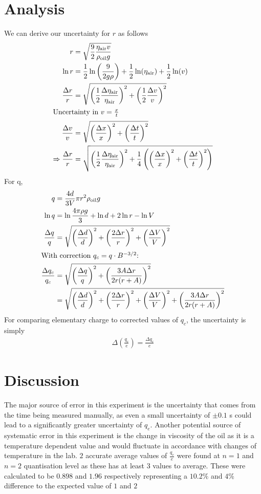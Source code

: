 \documentclass{article}
\begin{document}
\section{Analysis}
We can derive our uncertainty for $r$ as follows
\begin{align*}
r &= \sqrt{\frac{9}{2} \frac{\eta_{\text{air}} v}{\rho_{\text{oil}} g}} \\
\ln r &= \frac{1}{2} \ln\left(\frac{9}{2g\rho}\right) + \frac{1}{2} \ln(\eta_{\text{air}}) + \frac{1}{2} \ln(v) \\
\frac{\Delta r}{r} &= \sqrt{
    \left( \frac{1}{2} \frac{\Delta \eta_{\text{air}}}{\eta_{\text{air}}} \right)^2 
    + \left( \frac{1}{2} \frac{\Delta v}{v} \right)^2
} \\
\intertext{Uncertainty in \( v = \frac{x}{t} \)}
\frac{\Delta v}{v} &= \sqrt{
    \left( \frac{\Delta x}{x} \right)^2 
    + \left( \frac{\Delta t}{t} \right)^2
} \\
\Rightarrow \frac{\Delta r}{r} &= \sqrt{
    \left( \frac{1}{2} \frac{\Delta \eta_{\text{air}}}{\eta_{\text{air}}} \right)^2 
    + \frac{1}{4} \left( \left( \frac{\Delta x}{x} \right)^2 + \left( \frac{\Delta t}{t} \right)^2 \right)
}
\end{align*}
For q,
\begin{align*}
q &= \frac{4d}{3V} \pi r^2 \rho_{\text{oil}} g \\
\ln q &= \ln {\frac{4\pi\rho g}{3}} + \ln d + 2 \ln r - \ln V \\
\frac{\Delta q}{q} &= \sqrt{
    \left( \frac{\Delta d}{d} \right)^2 
    + \left( \frac{2 \Delta r}{r} \right)^2 
    + \left( \frac{\Delta V}{V} \right)^2
} \\
\intertext{{With correction \( q_c = q \cdot B^{-3/2} \)}:}
\frac{\Delta q_c}{q_c} &= \sqrt{
    \left( \frac{\Delta q}{q} \right)^2 
    + \left( \frac{3 A \Delta r}{2 r (r + A)} \right)^2
} \\
&= \sqrt{
    \left( \frac{\Delta d}{d} \right)^2 
    + \left( \frac{2 \Delta r}{r} \right)^2 
    + \left( \frac{\Delta V}{V} \right)^2
    + \left( \frac{3 A \Delta r}{2 r (r + A)} \right)^2
}
\end{align*}
For comparing elementary charge to corrected values of $q_c$, the uncertainty is simply
\begin{align*}
\Delta \left(\frac{q_c}{e}\right)=\frac{\Delta q_c}{e}
\end{align*}
\section{Discussion}
The major source of error in this experiment is the uncertainty that comes from the time being measured manually, as even a small uncertainty of $\pm 0.1$ \unit{s} could lead to a significantly greater uncertainty of $q_e$. Another potential source of systematic error in this experiment is the change in viscosity of the oil as it is a temperature dependent value and would fluctuate in accordance with changes of temperature in the lab. $2$ accurate average values of $\frac{q_e}{e}$  were found at $n=1$ and $n=2$ quantisation level as these has at least 3 values to average. These were calculated to be $0.898$ and $1.96$  respectively representing a $10.2\%$ and $4\%$ difference to the expected value of $1$ and $2$   
\end{document}

